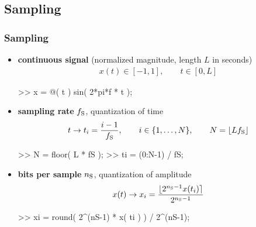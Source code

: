 
\subsection{Sampling}

\begin{frame}[fragile]
	\frametitle{Sampling}
	\begin{itemize}
		\item \textbf{continuous signal} (normalized magnitude, length $L$ in seconds)
			\begin{align*}
				x(t)\in[-1,1],\qquad t\in[0,L]
			\end{align*}
			\begin{code}
>> x = @( t ) sin( 2*pi*f * t ); \color[medium]%
			\end{code}
		\item \textbf{sampling rate} $f_{\textrm S}$, quantization of time
			\begin{align*}
				t\rightarrow t_i=\frac{i-1}{f_{\textrm S}},\qquad i\in\{1,\ldots,N\},\qquad N=\lfloor Lf_{\textrm S}\rfloor
			\end{align*}
			\begin{code}
>> N = floor( L * fS );
>> ti = (0:N-1) / fS; \color[medium]%
			\end{code}
		\item \textbf{bits per sample} $n_{\textrm S}$, quantization of amplitude
			\begin{align*}
				x(t)\rightarrow x_i=\frac{\lfloor2^{n_{\textrm S}-1}x(t_i)\rceil}{2^{n_{\textrm S}-1}}
			\end{align*}
			\begin{code}
>> xi = round( 2^(nS-1) * x( ti ) ) / 2^(nS-1); \color[medium]%
			\end{code}
	\end{itemize}
\end{frame}

